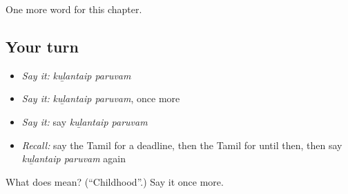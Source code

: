 \begin{grammarlens}[title={What you've built}]
One more word for this chapter.
\end{grammarlens}

\subsection*{Your turn}
\begin{itemize}
\raggedright
  \item \emph{Say it:} \emph{kuḻantaip paruvam}
  \item \emph{Say it:} \emph{kuḻantaip paruvam}, once more
  \item \emph{Say it:} say \emph{kuḻantaip paruvam}
  \item \emph{Recall:} say the Tamil for a deadline, then the Tamil for until then, then say \emph{kuḻantaip paruvam} again
\end{itemize}

\begin{tcolorbox}[breakable,colback=teal!4,colframe=teal!35!black,title={Before you move on}]
What does   mean? (\textquotedblleft{}Childhood\textquotedblright{}.) Say it once more.
\end{tcolorbox}
